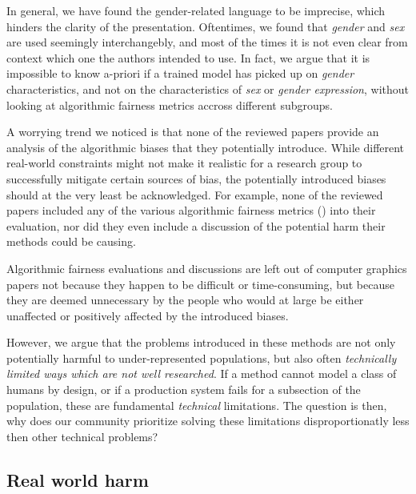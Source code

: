 \documentclass[nonacm,sigconf,review,balance=false]{acmart}
\begin{document}

In general, we have found the gender-related language to be imprecise, which hinders the clarity of the presentation. Oftentimes, we found that \emph{gender} and \emph{sex} are used seemingly interchangebly, and most of the times it is not even clear from context which one the authors intended to use. In fact, we argue that it is impossible to know a-priori if a trained model has picked up on \emph{gender} characteristics, and not on the characteristics of \emph{sex} or \emph{gender expression}, without looking at algorithmic fairness metrics accross different subgroups.


A worrying trend we noticed is that none of the reviewed papers provide an analysis of the algorithmic biases that they potentially introduce. While different real-world constraints might not make it realistic for a research group to successfully mitigate certain sources of bias, the potentially introduced biases should at the very least be acknowledged. For example, none of the reviewed papers included any of the various algorithmic fairness metrics () into their evaluation, nor did they even include a discussion of the potential harm their methods could be causing.

Algorithmic fairness evaluations and discussions are left out of computer graphics papers not because they happen to be difficult or time-consuming, but because they are deemed unnecessary by the people who would at large be either unaffected or positively affected by the introduced biases.

However, we argue that the problems introduced in these methods are not only potentially harmful to under-represented populations, but also often \emph{technically limited ways which are not well researched}. If a method cannot model a class of humans by design, or if a production system fails for a subsection of the population, these are fundamental \emph{technical} limitations. The question is then, why does our community prioritize solving these limitations disproportionatly less then other technical problems?

\subsection{Real world harm}
\end{document}
